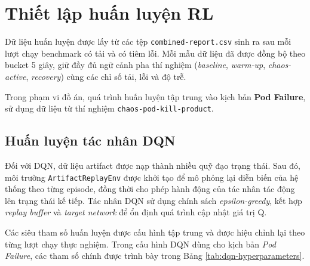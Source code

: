 \section{Thiết lập huấn luyện RL}

Dữ liệu huấn luyện được lấy từ các tệp \texttt{combined-report.csv} sinh ra sau mỗi lượt chạy benchmark có tải và có tiêm lỗi. Mỗi mẫu dữ liệu đã được đồng bộ theo bucket 5 giây, giữ đầy đủ ngữ cảnh pha thí nghiệm (\textit{baseline}, \textit{warm-up}, \textit{chaos-active}, \textit{recovery}) cùng các chỉ số tải, lỗi và độ trễ.

Trong phạm vi đồ án, quá trình huấn luyện tập trung vào kịch bản \textbf{Pod Failure}, sử dụng dữ liệu từ thí nghiệm \texttt{chaos-pod-kill-product}.

\subsection{Huấn luyện tác nhân DQN}

Đối với DQN, dữ liệu artifact được nạp thành nhiều quỹ đạo trạng thái. Sau đó, môi trường \texttt{ArtifactReplayEnv} được khởi tạo để mô phỏng lại diễn biến của hệ thống theo từng episode, đồng thời cho phép hành động của tác nhân tác động lên trạng thái kế tiếp. Tác nhân DQN sử dụng chính sách \textit{epsilon-greedy}, kết hợp \textit{replay buffer} và \textit{target network} để ổn định quá trình cập nhật giá trị Q.

Các siêu tham số huấn luyện được cấu hình tập trung và được hiệu chỉnh lại theo từng lượt chạy thực nghiệm. Trong cấu hình DQN dùng cho kịch bản \textit{Pod Failure}, các tham số chính được trình bày trong Bảng \ref{tab:dqn-hyperparameters}.

